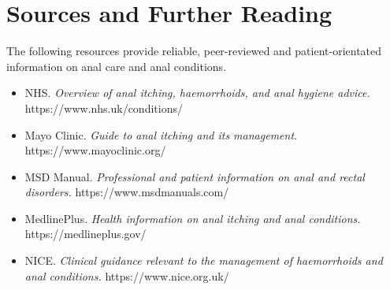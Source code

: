 \section*{Sources and Further Reading}
The following resources provide reliable, peer-reviewed and patient-orientated information on anal care and anal conditions.

\begin{itemize}
    \item NHS. \textit{Overview of anal itching, haemorrhoids, and anal hygiene advice.} https://www.nhs.uk/conditions/
    \item Mayo Clinic. \textit{Guide to anal itching and its management.} https://www.mayoclinic.org/
    \item MSD Manual. \textit{Professional and patient information on anal and rectal disorders.} https://www.msdmanuals.com/
    \item MedlinePlus. \textit{Health information on anal itching and anal conditions.} https://medlineplus.gov/
    \item NICE. \textit{Clinical guidance relevant to the management of haemorrhoids and anal conditions.} https://www.nice.org.uk/
\end{itemize}
